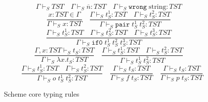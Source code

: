 \begin{figure}
\[
\Gamma\vdash_{S}TST
\quad
\Gamma\vdash_{S}\overline{n}:TST
\quad
\Gamma\vdash_{S}\mathtt{wrong}\;\mathrm{string}:TST
\]
\[
\frac{x:TST\in\Gamma}{\Gamma\vdash_{S}x:TST}
\quad
\frac{\Gamma\vdash_{S}t_{S}^{1}:TST\quad\Gamma\vdash_{S}t_{S}^{2}:TST}{\Gamma\vdash_{S}\mathtt{pair}\;t_{S}^{1}\;t_{S}^{2}:TST}
\]
\[
\frac{\Gamma\vdash_{S}t_{S}^{1}:TST\quad\Gamma\vdash_{S}t_{S}^{2}:TST\quad\Gamma\vdash_{S}t_{S}^{3}:TST}{\Gamma\vdash_{S}\mathtt{if0}\;t_{S}^{1}\;t_{S}^{2}\;t_{S}^{3}:TST}
\]
\[
\frac{\Gamma,x:TST\vdash_{S}t_{S}:TST}{\Gamma\vdash_{S}\lambda x.t_{S}:TST}
\quad
\frac{\Gamma\vdash_{S}t_{S}^{1}:TST\quad\Gamma\vdash_{S}t_{S}^{2}:TST}{\Gamma\vdash_{S}t_{S}^{1}\;t_{S}^{2}:TST}
\]
\[
\quad
\frac{\Gamma\vdash_{S}t_{S}^{1}:TST\quad\Gamma\vdash_{S}t_{S}^{2}:TST}{\Gamma\vdash_{S}o\;t_{S}^{1}\;t_{S}^{2}:TST}
\quad
\frac{\Gamma\vdash_{S}t_{S}:TST}{\Gamma\vdash_{S}f\;t_{S}:TST}
\quad
\frac{\Gamma\vdash_{S}t_{S}:TST}{\Gamma\vdash_{S}p\;t_{S}:TST}
\]
\caption{Scheme core typing rules}
\label{sctr}
\end{figure}